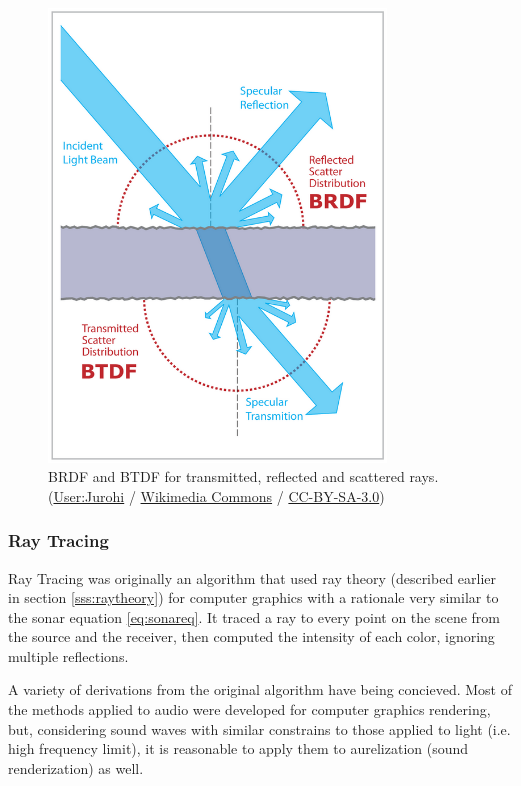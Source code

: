 \begin{figure}
	\centering
	\includegraphics[width=0.8\textwidth]{Chap2/fig/BRDF_BTDF}
	\caption{BRDF and BTDF for transmitted, reflected and scattered rays.
	(\textcopyright  \href{http://commons.wikimedia.org/wiki/User:Jurohi}{User:Jurohi} /
	\href{http://commons.wikimedia.org/}{Wikimedia Commons} /
	\href{http://creativecommons.org/licenses/by-sa/3.0/}{CC-BY-SA-3.0})}
	\label{fig:brdfbtdf}
\end{figure}




\subsubsection{Ray Tracing}

Ray Tracing was originally an algorithm that used ray theory
(described earlier in section \ref{sss:raytheory}) for computer graphics with a
rationale very similar to the sonar equation \ref{eq:sonareq}. It traced a ray to every point on the scene
from the source and the receiver, then computed the intensity of each color,
ignoring multiple reflections. 

A variety of derivations from the original algorithm have being concieved. Most
of the methods applied to audio were developed for computer graphics
rendering, but, considering sound waves with similar constrains to those
applied to light (i.e. high frequency limit), it is reasonable to apply them to
aurelization (sound renderization) as well.


